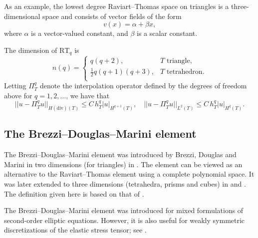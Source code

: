 As an example, the lowest degree Raviart--Thomas space on triangles is a
three-dimensional space and consists of vector fields of the form
\begin{equation}
  v(x) = \alpha + \beta x,
\end{equation}
where $\alpha$ is a vector-valued constant, and $\beta$ is a scalar
constant.

The dimension of $\mathrm{RT}_q$ is
\begin{equation}
  n(q) = \left \{
  \begin{array}{ll}
  q (q + 2), & T \text{ triangle}, \\
  \frac{1}{2} q (q + 1)(q + 3), & T \text{ tetrahedron}.\\
  \end{array}
  \right .
\end{equation}
Letting $\Pi_T^q$ denote the interpolation operator defined by the
degrees of freedom above for $q = 1, 2, \dots$, we have
that \citep[Chapter III.3]{BrezziFortin1991}
\begin{equation}
  ||u - \Pi_T^q u||_{H(\mathrm{div})(T)} \leqslant C \, h_T^{q} |u|_{H^{q+1}(T)}, \quad
  ||u - \Pi_T^q u||_{L^2(T)} \leqslant C \, h_T^{q} |u|_{H^{q}(T)}.
\end{equation}

\subsection{The Brezzi--Douglas--Marini element}

The Brezzi--Douglas--Marini element was introduced by Brezzi,
Douglas and Marini in two dimensions (for triangles) in
\citet{BrezziDouglasMarini1985}. The element can be viewed as
an alternative to the Raviart--Thomas element using a complete
polynomial space. It was later extended to three dimensions
(tetrahedra, prisms and cubes) in \citet{Nedelec1986} and
\citet{BrezziDouglasDuranFortin1987}. The definition given here is based
on that of \citet{Nedelec1986}.

The Brezzi--Douglas--Marini element was introduced for mixed
formulations of second-order elliptic equations. However, it is also
useful for weakly symmetric discretizations of the elastic stress
tensor; see \citet{FarhloulFortin1997, ArnoldFalkWinther2007}.

